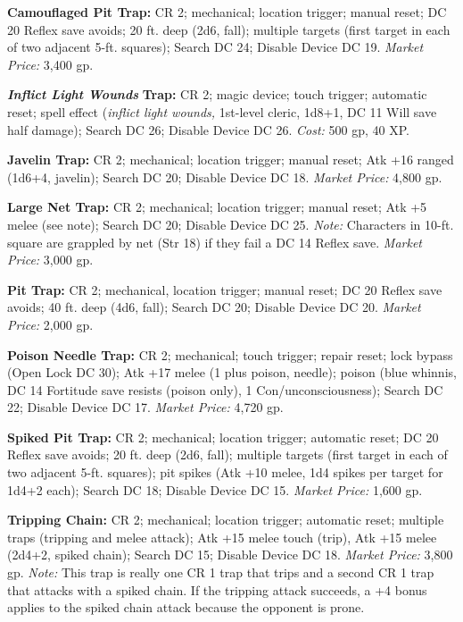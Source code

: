 \documentclass{article}
\begin{document}
\textbf{Camouflaged Pit Trap: }CR 2; mechanical; location trigger; manual reset; 
DC 20 Reflex save avoids; 20 ft. deep (2d6, fall); multiple targets (first target 
in each of two adjacent 5-ft. squares); Search DC 24; Disable Device DC 19. \textit{Market 
Price: }3,400 gp.

\textit{\textbf{Inflict Light Wounds }}\textbf{Trap:} CR 2; magic device; touch 
trigger; automatic reset; spell effect (\textit{inflict light wounds, }1st-level 
cleric, 1d8+1, DC 11 Will save half damage); Search DC 26; Disable Device DC 26. 
\textit{Cost: }500 gp, 40 XP.

\textbf{Javelin Trap:} CR 2; mechanical; location trigger; manual reset; Atk +16 
ranged (1d6+4, javelin); Search DC 20; Disable Device DC 18. \textit{Market Price: 
}4,800 gp.

\textbf{Large Net Trap:} CR 2; mechanical; location trigger; manual reset; Atk 
+5 melee (see note); Search DC 20; Disable Device DC 25. \textit{Note: }Characters 
in 10-ft. square are grappled by net (Str 18) if they fail a DC 14 Reflex save. 
\textit{Market Price: }3,000 gp.

\textbf{Pit Trap: }CR 2; mechanical, location trigger; manual reset; DC 20 Reflex 
save avoids; 40 ft. deep (4d6, fall); Search DC 20; Disable Device DC 20. \textit{Market 
Price: }2,000 gp.

\textbf{Poison Needle Trap: }CR 2; mechanical; touch trigger; repair reset; lock 
bypass (Open Lock DC 30); Atk +17 melee (1 plus poison, needle); poison (blue whinnis, 
DC 14 Fortitude save resists (poison only), 1 Con/unconsciousness); Search DC 22; 
Disable Device DC 17. \textit{Market Price: }4,720 gp.

\textbf{Spiked Pit Trap: }CR 2; mechanical; location trigger; automatic reset; 
DC 20 Reflex save avoids; 20 ft. deep (2d6, fall); multiple targets (first target 
in each of two adjacent 5-ft. squares); pit spikes (Atk +10 melee, 1d4 spikes per 
target for 1d4+2 each); Search DC 18; Disable Device DC 15. \textit{Market Price: 
}1,600 gp.

\textbf{Tripping Chain: }CR 2; mechanical; location trigger; automatic reset; multiple 
traps (tripping and melee attack); Atk +15 melee touch (trip), Atk +15 melee (2d4+2, 
spiked chain); Search DC 15; Disable Device DC 18. \textit{Market Price: }3,800 
gp. \textit{Note: }This trap is really one CR 1 trap that trips and a second CR 
1 trap that attacks with a spiked chain. If the tripping attack succeeds, a +4 
bonus applies to the spiked chain attack because the opponent is prone.
\end{document}
